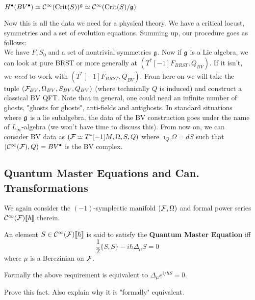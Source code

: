 \begin{corollary}
  $H^\bullet(BV^\bullet) \simeq \mathcal{C}^{\infty}(\operatorname{Crit}(S))^{\mathfrak{g}} \simeq \mathcal{C}^{\infty}(\operatorname{Crit}(S)/\mathfrak{g})$
\end{corollary}

Now this is all the data we need for a physical theory. We have a critical locust, symmetries and a set of evolution equations. Summing up, our procedure goes as follows:\\

We have $F, S_0$ and a set of nontrivial symmetries $\mathfrak{g}$. Now if $\mathfrak{g}$ is a Lie algebra, we can look at pure BRST or more generally at $(T^*[-1]F_{BRST}, Q_{BV})$. If it isn't, we \emph{need} to work with $(T^*[-1]F_{BRST}, Q_{BV})$. From here on we will take the tuple $({\mathcal{F}}_{BV}, \Omega_{BV}, S_{BV}, Q_{BV})$ (where technically $Q$ is induced) and construct a classical BV QFT. Note that in general, one could need an infinite number of ghosts, "ghosts for ghosts", anti-fields and antighosts. In standard situations where $\mathfrak{g}$ is a lie subalgebra, the data of the BV construction goes under the name of $L_\infty$-algebra (we won't have time to discuss this). From now on, we can consider BV data as $({\mathcal{F}} \simeq T^*[-1]M, \Omega, S, Q)$ where $\imath_Q \Omega = dS$ such that $(\mathcal{C}^{\infty}({\mathcal{F}}), Q) = BV^\bullet$ is the BV complex.

\subsection{Quantum Master Equations and Can. Transformations}

We again consider the $(-1)$-symplectic manifold $({\mathcal{F}}, \Omega)$ and formal power series $\mathcal{C}^{\infty}({\mathcal{F}})\llbracket \hbar \rrbracket$ therein.

\begin{definition}
  An element $S \in \mathcal{C}^{\infty}({\mathcal{F}})\llbracket \hbar \rrbracket$ is said to satisfy the \textbf{Quantum Master Equation} iff
  \begin{equation} \tag{$QME$} \label{QME}
    \frac{1}{2} \{S,S\} - i \hbar \Delta_\mu S = 0
  \end{equation}
  where $\mu$ is a Berezinian on ${\mathcal{F}}$.
\end{definition}

Formally the above requirement is equivalent to $\Delta_\mu e^{i/\hbar S} = 0$.

\begin{ex}
  Prove this fact. Also explain why it is "formally" equivalent.
\end{ex}

